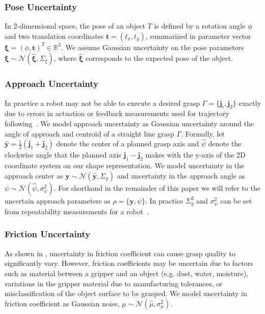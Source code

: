 \documentclass[10pt, conference]{ieeeconf}      %
\newcommand{\bj}{\mathbf{j}}
\newcommand{\bt}{\mathbf{t}}
\newcommand{\by}{\mathbf{y}}
\newcommand{\mN}{\mathcal{N}}
\begin{document}
\subsubsection{Pose Uncertainty}
In 2-dimensional space, the pose of an object $T$ is defined by a rotation angle $\phi$ and two translation coordinates $\bt = (t_x, t_y)$, summarized in parameter vector $\mathbf{\xi} = (\phi, \bt)^T \in \mathbb{R}^3$.  We assume Gaussian uncertainty on the pose parameters $\mathbf{\xi} \sim \mN \left( \hat{\mathbf{\xi}}, \Sigma_{\xi} \right)$, where $\hat{\mathbf{\xi}}$ corresponds to the expected pose of the object. 

 
 \subsubsection{Approach Uncertainty}
In practice a robot may not be able to execute a desired grasp $\Gamma = \lbrace \bj_i,\bj_2\rbrace$ exactly due to errors in actuation or feedback measurements used for trajectory following~\cite{kehoe2012estimating}.
We model approach uncertainty as Gaussian uncertainty around the angle of approach and centroid of a straight line grasp $\Gamma$.
Formally, let $\hat{\by} = \frac{1}{2} (\bj_1 + \bj_2)$ denote the center of a planned grasp axis and $\hat{\psi}$ denote the clockwise angle that the planned axis $\bj_1 - \bj_2$ makes with the y-axis of the 2D coordinate system on our shape representation.
We model uncertainty in the approach center as $\by \sim \mN(\hat{\by}, \Sigma_y)$ and uncertainty in the approach angle as $\psi \sim \mN(\hat{\psi}, \sigma_{\psi}^2)$.
For shorthand in the remainder of this paper we will refer to the uncertain approach parameters as $\rho = \{\by, \psi \}$.
In practice $\Sigma_{y}^2$ and $\sigma_{\psi}^2$ can be set from repeatability measurements for a robot~\cite{mooring1986determination}.

 \subsubsection{Friction Uncertainty}
As shown in \cite{zheng2005,hang2013a}, uncertainty in friction coefficient can cause grasp quality to significantly vary.
However, friction coefficients may be uncertain due to factors such as material between a gripper and an object (e.g. dust, water, moisture), variations in the gripper material due to manufacturing tolerances, or misclassification of the object surface to be grasped.
We model uncertainty in friction coefficient as Gaussian noise, $\mu \sim \mN(\hat{\mu},\sigma_{\mu}^2)$.
\end{document}

